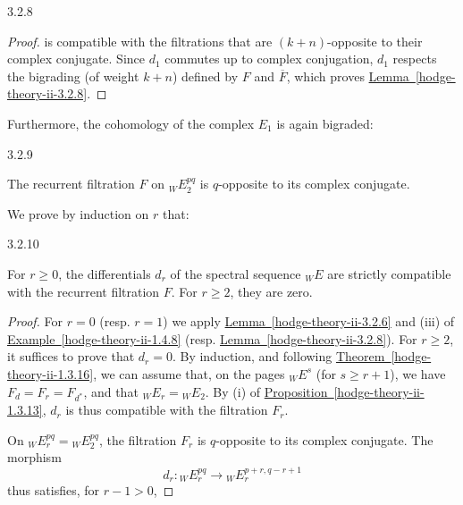 \begin{lemma}{3.2.8}
\begin{proof}
      is compatible with the filtrations that are \((k+n)\)-opposite to their complex conjugate.
      Since \(d_1\) commutes up to complex conjugation, \(d_1\) respects the bigrading (of weight \(k+n\)) defined by \(F\) and \(\overline {F}\), which proves \hyperref[hodge-theory-ii-3.2.8]{Lemma~\ref*{hodge-theory-ii-3.2.8}}.\end{proof}\end{lemma}\par{}Furthermore, the cohomology of the complex \(E_1\) is again bigraded:\begin{lemma}{3.2.9}\label{hodge-theory-ii-3.2.9}\skipsinglepar\par{}The recurrent filtration \(F\) on \({}_WE_2^{pq}\) is \(q\)-opposite to its complex conjugate.\end{lemma}\par{}We prove by induction on \(r\) that:\begin{lemma}{3.2.10}\label{hodge-theory-ii-3.2.10}\skipsinglepar\par{}For \(r\geqslant 0\), the differentials \(d_r\) of the spectral sequence \({}_WE\) are strictly compatible with the recurrent filtration \(F\).
    For \(r\geqslant 2\), they are zero.\begin{proof}\par{}For \(r=0\) (resp. \(r=1\)) we apply \hyperref[hodge-theory-ii-3.2.6]{Lemma~\ref*{hodge-theory-ii-3.2.6}} and (iii) of \hyperref[hodge-theory-ii-1.4.8]{Example~\ref*{hodge-theory-ii-1.4.8}} (resp. \hyperref[hodge-theory-ii-3.2.8]{Lemma~\ref*{hodge-theory-ii-3.2.8}}).
      For \(r\geqslant 2\), it suffices to prove that \(d_r=0\).
      By induction, and following \hyperref[hodge-theory-ii-1.3.16]{Theorem~\ref*{hodge-theory-ii-1.3.16}}, we can assume that, on the pages \({}_WE^s\) (for \(s\geqslant  r+1\)), we have \(F_d=F_r=F_{d^*}\), and that \({}_WE_r={}_WE_2\).
      By (i) of \hyperref[hodge-theory-ii-1.3.13]{Proposition~\ref*{hodge-theory-ii-1.3.13}}, \(d_r\) is thus compatible with the filtration \(F_r\).\par{}On \({}_WE_r^{pq}={}_WE_2^{pq}\), the filtration \(F_r\) is \(q\)-opposite to its complex conjugate.
      The morphism
      \[         d_r\colon  {}_WE_r^{pq}         \to  {}_WE_r^{p+r,q-r+1}       \]
      thus satisfies, for \(r-1>0\),

\end{proof}
\end{lemma}
